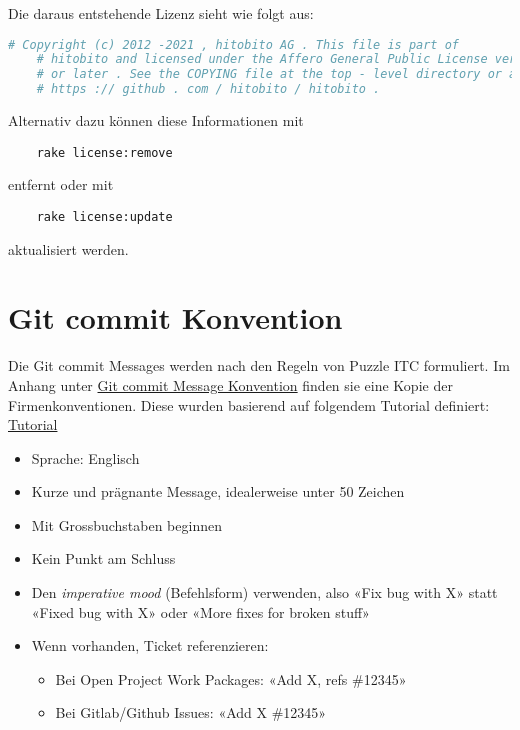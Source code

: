 \newpage

Die daraus entstehende Lizenz sieht wie folgt aus:
\newline

\begin{lstlisting}[language=Ruby]
    # Copyright (c) 2012 -2021 , hitobito AG . This file is part of
    # hitobito and licensed under the Affero General Public License version 3
    # or later . See the COPYING file at the top - level directory or at
    # https :// github . com / hitobito / hitobito .
\end{lstlisting}

Alternativ dazu können diese Informationen mit 

\begin{verbatim}
    rake license:remove 
\end{verbatim}

entfernt oder mit 

\begin{verbatim}
    rake license:update 
\end{verbatim} aktualisiert werden.

\section{Git commit Konvention}
Die Git commit Messages werden nach den Regeln von Puzzle ITC formuliert. Im Anhang
unter \hyperref[sec:gitconv]{Git commit Message Konvention} finden sie eine Kopie der Firmenkonventionen. Diese wurden 
basierend auf folgendem Tutorial definiert: \href{https://cbea.ms/git-commit}{Tutorial}

\begin{itemize}
    \item Sprache: Englisch
    \item Kurze und prägnante Message, idealerweise unter 50 Zeichen
    \item Mit Grossbuchstaben beginnen
    \item Kein Punkt am Schluss
    \item Den \textit{imperative mood} (Befehlsform) verwenden, also «Fix bug with X» statt «Fixed bug with X» oder «More fixes for broken stuff»
    \item Wenn vorhanden, Ticket referenzieren:
    \begin{itemize}
        \item Bei Open Project Work Packages: «Add X, refs \#12345»
        \item Bei Gitlab/Github Issues: «Add X \#12345»
    \end{itemize}
\end{itemize}


